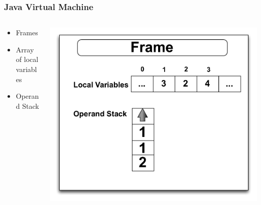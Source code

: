 \documentclass{beamer}
\begin{document}
\begin{frame}
	\frametitle{Java Virtual Machine}
\begin{columns}
\begin{column}{0.5\textwidth}
\begin{itemize}	
\item Frames
\item Array of local variables
\item Operand Stack
\end{itemize}
\end{column}
\begin{column}{0.5\textwidth}
\includegraphics[width=1\textwidth]{Illustrations/frame.pdf}
\end{column}
\end{columns}



\end{frame}
\end{document}
